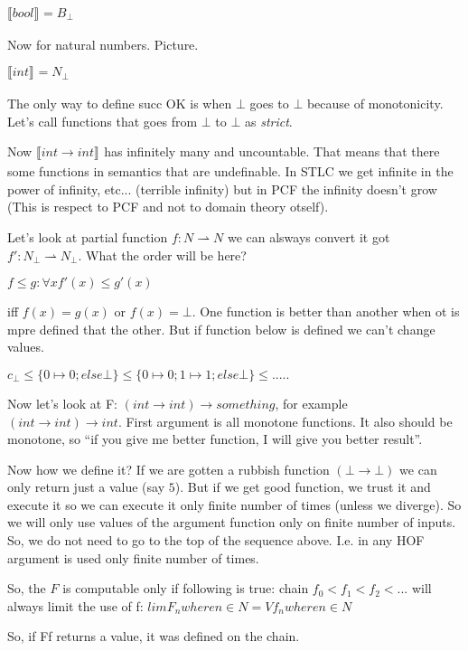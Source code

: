 \documentclass[a4paper,10pt]{book}
\newcommand{\sem}[2]{ \llbracket#1\rrbracket_{#2} }
\newcommand{\rarr}{ \rightarrow }
\begin{document}
$\sem{bool}{} = B_\bot$

Now for natural numbers. Picture.

$\sem{int}{} = N_\bot$ 

The only way to define succ OK is when $\bot$ goes to $\bot$ because of monotonicity. Let's call
functions that goes from $\bot$ to $\bot$ as \textit{strict}.

Now 
$\sem{int \rarr int}{}$ has infinitely many and uncountable. That means that there some functions
in semantics that are undefinable. In STLC we get infinite in the power of infinity, etc... (terrible 
infinity) but in PCF the infinity doesn't grow (This is respect to PCF and not to domain theory otself).

Let's look at partial function $f: N \rightharpoonup N$ we can alsways convert it got 
$f': N_\bot \rightharpoonup N_\bot$. What the order will be here?


$ f \leq g: \forall x f'(x) \leq g'(x)$

iff $f(x) = g(x)$ or $f(x)=\bot$. One function is better than another when ot is mpre defined that
the other. But if function below is defined we can't change values.

$c_\bot \leq \{0\mapsto 0; else \bot\}
        \leq \{0\mapsto 0; 1\mapsto 1; else \bot\}
        \leq .....
        $
        
Now let's look at F: $(int \rarr int) \rarr something$, for example        
$(int \rarr int) \rarr int$. First argument is all monotone functions. It also should be monotone,
so ``if you give me better function, I will give you better result''.

Now how we define it? If we are gotten a rubbish function $(\bot \rarr\bot)$ we can only return 
just a value (say $5$). But if we get good function, we trust it and execute it so
we can execute it only finite number of times (unless we diverge). So we will only use values of the 
argument function only on finite number of inputs.  So, we do not need to go to the top of the 
sequence above. I.e. in any HOF argument is used only finite number of times.
        
So, the $F$ is computable only if following is true:
chain $f_0 < f_1 < f_2 < ...$ will always limit the use of f: 
$lim F_n where n\in N = V f_n where n\in N$


So, if Ff returns a value, it was defined on the chain.
\end{document}
